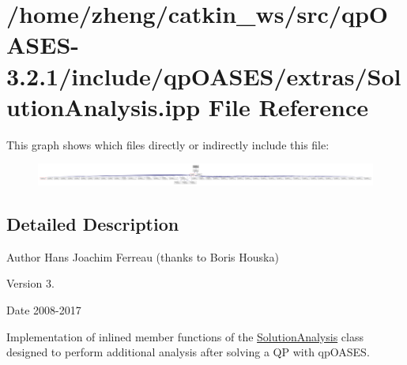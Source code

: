 \hypertarget{_solution_analysis_8ipp}{}\section{/home/zheng/catkin\+\_\+ws/src/qp\+O\+A\+S\+E\+S-\/3.2.1/include/qp\+O\+A\+S\+E\+S/extras/\+Solution\+Analysis.ipp File Reference}
\label{_solution_analysis_8ipp}
This graph shows which files directly or indirectly include this file\+:
\nopagebreak
\begin{figure}[H]
\begin{center}
\leavevmode
\includegraphics[width=350pt]{_solution_analysis_8ipp__dep__incl}
\end{center}
\end{figure}


\subsection{Detailed Description}
\begin{DoxyAuthor}{Author}
Hans Joachim Ferreau (thanks to Boris Houska) 
\end{DoxyAuthor}
\begin{DoxyVersion}{Version}
3. 
\end{DoxyVersion}
\begin{DoxyDate}{Date}
2008-\/2017
\end{DoxyDate}
Implementation of inlined member functions of the \hyperlink{class_solution_analysis}{Solution\+Analysis} class designed to perform additional analysis after solving a QP with qp\+O\+A\+S\+ES. 